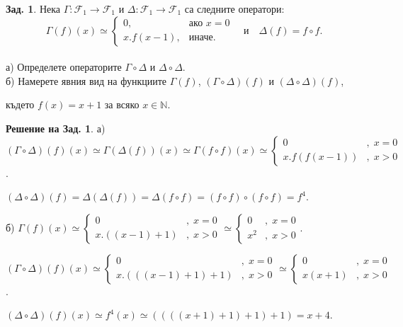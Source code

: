 \documentclass[a4paper,9pt]{extarticle}
\theoremstyle{definition}
\newtheorem{problem}{Зад.}
\newtheorem{solution}{Решение на Зад.}
\newcommand{\Nat}{\mathbb{N}}
\newcommand{\F}{\mathcal{F}}
\begin{document}
\begin{problem} Нека  $\Gamma\!: \F_1 \rightarrow \F_1$ и  $\Delta\!: \F_1 \rightarrow \F_1$ са следните оператори:
   $$\Gamma(f)(x) \simeq
  \begin{cases}
   0, & \text{ако } x=0\\
    x.f(x-1), & \text{иначе. }
  \end{cases}
 {}\quad  \text{и}\quad \Delta(f) = f\circ f.
$$ \\
а) Определете операторите $\Gamma\circ \Delta$ и $\Delta\circ \Delta$. \\
б) Намерете  явния вид на  функциите $\Gamma(f)$, $(\Gamma\circ \Delta)(f)$ и $(\Delta\circ \Delta)(f)$, 
\vskip1pt    

където   $f(x)= x+1 $ за всяко $x\in \Nat.$
\end{problem}

\begin{solution}
а) \((\Gamma\circ \Delta)(f)(x) \simeq \Gamma(\Delta(f))(x) \simeq \Gamma(f \circ f)(x) \simeq \begin{cases}
    0 &, \; x = 0 \\
    x.f(f(x - 1)) &, \; x > 0
\end{cases}\).

\vskip7pt

\((\Delta\circ \Delta)(f) = \Delta(\Delta(f)) = \Delta(f \circ f) = (f \circ f) \circ (f \circ f) = f^4\).

\vskip7pt

б) \(\Gamma(f)(x) \simeq \begin{cases}
    0 &, \; x = 0 \\
    x.((x - 1) + 1) &, \; x > 0
\end{cases} \simeq \begin{cases}
    0 &, \; x = 0 \\
    x^2 &, \; x > 0
\end{cases}\).

\vskip7pt

\((\Gamma \circ \Delta)(f)(x) \simeq \begin{cases}
    0 &, \; x = 0 \\
    x.(((x - 1) + 1) + 1) &, \; x > 0
\end{cases} \simeq \begin{cases}
    0 &, \; x = 0 \\
    x(x +1) &, \; x > 0
\end{cases}\).

\vskip7pt

\((\Delta \circ \Delta)(f)(x) \simeq f^4(x) \simeq ((((x + 1) + 1) + 1) + 1) = x + 4\).


\end{solution}
\end{document}
